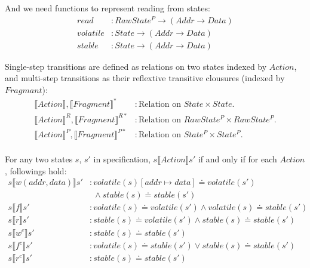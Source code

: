 \documentclass[a4paper,11pt]{article}
\theoremstyle{definition}
\begin{document}
And we need functions to represent reading from states:
\begin{align*}
	read &: \mathit{RawState^P} \to (\mathit{Addr} \to \mathit{Data})\\
	volatile &: \mathit{State} \to (\mathit{Addr} \to \mathit{Data})\\
	stable &: \mathit{State} \to (\mathit{Addr} \to \mathit{Data})
\end{align*}

\newpage

Single-step transitions are defined as relations on two states indexed by $\mathit{Action}$, and multi-step transitions as their reflextive transitive clousures (indexed by $\mathit{Fragmant}$):
\begin{align*}
	\llbracket \mathit{Action} \rrbracket, \llbracket \mathit{Fragment} \rrbracket^* &: \text{Relation on $\mathit{State \times State}$.}\\
	\llbracket \mathit{Action} \rrbracket^R, \llbracket \mathit{Fragment} \rrbracket^{R*} &: \text{Relation on $\mathit{RawState^P \times RawState^P}$.}\\
	\llbracket \mathit{Action} \rrbracket^P, \llbracket \mathit{Fragment} \rrbracket^{P*} &: \text{Relation on $\mathit{State^P \times State^P}$.}\\
\end{align*}

For any two states $s$, $s'$ in specification, $s \llbracket \mathit{Action} \rrbracket s'$ if and only if for each $\mathit{Action}$, followings hold:
\begin{align*}
	s \llbracket w(addr, data) \rrbracket s' &: \mathit{volatile(s)[addr \mapsto data]} \doteq \mathit{volatile(s')}\\
	& \ \  \land stable(s) \doteq stable(s')\\
	s \llbracket f \rrbracket s' &: \mathit{volatile(s)} \doteq \mathit{volatile(s')} \land \mathit{volatile(s)} \doteq \mathit{stable(s')}\\
	s \llbracket r \rrbracket s' &: \mathit{stable(s)} \doteq \mathit{volatile(s')} \land \mathit{stable(s)} \doteq \mathit{stable(s')}\\
	s \llbracket w^c \rrbracket s' &: \mathit{stable(s)} \doteq \mathit{stable(s')}\\
	s \llbracket f^c \rrbracket s' &: \mathit{volatile(s)} \doteq \mathit{stable(s')} \lor \mathit{stable(s)} \doteq \mathit{stable(s')}\\
	s \llbracket r^c \rrbracket s' &: \mathit{stable(s)} \doteq \mathit{stable(s')}
\end{align*}
\end{document}
